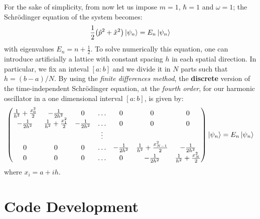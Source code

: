 \documentclass[rmp,10pt,onecolumn,fleqn,notitlepage]{revtex4-1}
\begin{document}
For the sake of simplicity, from now let us impose \( m=1 \), \( \hbar =1 \) and \( \omega =1 \); the Schrödinger equation of the system becomes:
\begin{equation}
  \frac{1}{2} \qty( \hat{p}^2 + \hat{x}^2) \ket{\psi_n} = E_n \ket{\psi_n }
\end{equation}
with eigenvalues \( E_n = n + \frac{1}{2} \).
To solve numerically this equation, one can introduce artificially a lattice with constant spacing $h$ in each spatial direction.
In particular, we fix an inteval \( [a:b] \) and we divide it in \( N \) parts such that \( h=(b-a)/N\).
By using the \emph{finite differences method}, the \textbf{discrete} version of the time-independent Schrödinger equation, at the \emph{fourth order}, for our harmonic oscillator in a one dimensional interval \( [a:b] \), is given by:
\begin{equation}
  \begin{pmatrix}
      \frac{1}{h^2} + \frac{x_0^2}{2} & -\frac{1}{2 h^2} & 0 & \dots & 0 & 0 & 0 \\
      -\frac{1}{2 h^2}& \frac{1}{h^2} + \frac{x_1^2}{2} &   -\frac{1}{2 h^2} & \dots & 0 & 0 & 0 \\
      & & & \vdots & & & \\
      0 & 0 & 0 & \dots & -\frac{1}{2 h^2} &  \frac{1}{h^2} + \frac{x_{N-1}^2}{2} &-\frac{1}{2 h^2} \\
      0 & 0 & 0 & \dots & 0 & -\frac{1}{2 h^2} &   \frac{1}{h^2} + \frac{x_{N}^2}{2}
  \end{pmatrix} \ket{\psi _n} = E_n \ket{\psi _n}
\end{equation}
where \( x_i = a + i h \).




\section{Code Development}
\end{document}
